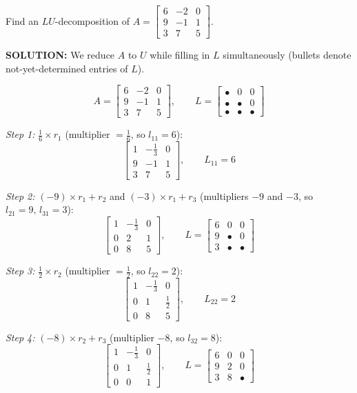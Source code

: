 \documentclass{article}
\begin{document}
Find an $LU$-decomposition of $A = \begin{bmatrix}6&-2&0\\9&-1&1\\3&7&5\end{bmatrix}$.

\textbf{SOLUTION:} We reduce $A$ to $U$ while filling in $L$ simultaneously (bullets
denote not-yet-determined entries of $L$).

\[
A = \begin{bmatrix}6&-2&0\\9&-1&1\\3&7&5\end{bmatrix},\qquad
L = \begin{bmatrix}\bullet&0&0\\\bullet&\bullet&0\\\bullet&\bullet&\bullet\end{bmatrix}
\]

\noindent\textit{Step 1:} $\frac{1}{6}\times r_1$ (multiplier $= \frac{1}{6}$, so $l_{11}=6$):
\[
\begin{bmatrix}1&-\frac{1}{3}&0\\9&-1&1\\3&7&5\end{bmatrix},\qquad
L_{11}=6
\]

\noindent\textit{Step 2:} $(-9)\times r_1 + r_2$ and $(-3)\times r_1 + r_3$ (multipliers
$-9$ and $-3$, so $l_{21}=9,\,l_{31}=3$):
\[
\begin{bmatrix}1&-\frac{1}{3}&0\\0&2&1\\0&8&5\end{bmatrix},\qquad
L=\begin{bmatrix}6&0&0\\9&\bullet&0\\3&\bullet&\bullet\end{bmatrix}
\]

\noindent\textit{Step 3:} $\frac{1}{2}\times r_2$ (multiplier $=\frac{1}{2}$, so $l_{22}=2$):
\[
\begin{bmatrix}1&-\frac{1}{3}&0\\0&1&\frac{1}{2}\\0&8&5\end{bmatrix},\qquad
L_{22}=2
\]

\noindent\textit{Step 4:} $(-8)\times r_2 + r_3$ (multiplier $-8$, so $l_{32}=8$):
\[
\begin{bmatrix}1&-\frac{1}{3}&0\\0&1&\frac{1}{2}\\0&0&1\end{bmatrix},\qquad
L=\begin{bmatrix}6&0&0\\9&2&0\\3&8&\bullet\end{bmatrix}
\]
\end{document}
